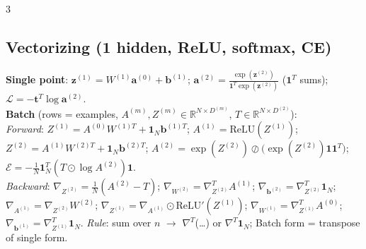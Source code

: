 \documentclass[10pt]{article}
\newcommand{\vt}{\mathbf{t}}
\newcommand{\cE}{\mathcal{E}}
\newcommand{\cL}{\mathcal{L}}
\newcommand{\sub}[1]{\textit{#1}:}  %
\newcommand{\va}{\mathbf{a}}
\newcommand{\vb}{\mathbf{b}}
\newcommand{\vz}{\mathbf{z}}
\begin{document}
\begin{multicols*}{3}
\subsection{Vectorizing (1 hidden, ReLU, softmax, CE)}
\textbf{Single point}: $\vz^{(1)}=W^{(1)}\va^{(0)}+\vb^{(1)}$; $\va^{(2)}=\frac{\exp(\vz^{(2)})}{\mathbf 1^T\exp(\vz^{(2)})}$ ($\mathbf 1^T$ sums); $\cL=-\vt^T\log\va^{(2)}$.\\
\textbf{Batch} (rows = examples, $A^{(m)},Z^{(m)}\in\mathbb R^{N\times D^{(m)}}$, $T\in\mathbb R^{N\times D^{(2)}}$):\\
\sub{Forward} $Z^{(1)}=A^{(0)}W^{(1)T}+\mathbf 1_N\vb^{(1)T}$; $A^{(1)}=\text{ReLU}(Z^{(1)})$; $Z^{(2)}=A^{(1)}W^{(2)T}+\mathbf 1_N\vb^{(2)T}$; $A^{(2)}=\exp(Z^{(2)})\oslash\big(\exp(Z^{(2)})\mathbf 1\mathbf 1^T\big)$; $\cE=-\frac1N\mathbf 1_N^T(T\odot\log A^{(2)})\mathbf 1$.\\
\sub{Backward} $\nabla_{Z^{(2)}}=\frac1N(A^{(2)}-T)$; $\nabla_{W^{(2)}}=\nabla_{Z^{(2)}}^TA^{(1)}$; $\nabla_{\vb^{(2)}}=\nabla_{Z^{(2)}}^T\mathbf 1_N$; $\nabla_{A^{(1)}}=\nabla_{Z^{(2)}}W^{(2)}$; $\nabla_{Z^{(1)}}=\nabla_{A^{(1)}}\odot\text{ReLU}'(Z^{(1)})$; $\nabla_{W^{(1)}}=\nabla_{Z^{(1)}}^TA^{(0)}$; $\nabla_{\vb^{(1)}}=\nabla_{Z^{(1)}}^T\mathbf 1_N$. \sub{Rule} sum over $n$ $\to$ $\nabla^T$(\ldots) or $\nabla^T\mathbf 1_N$; Batch form = transpose of single form.


\end{multicols*}
\end{document}
